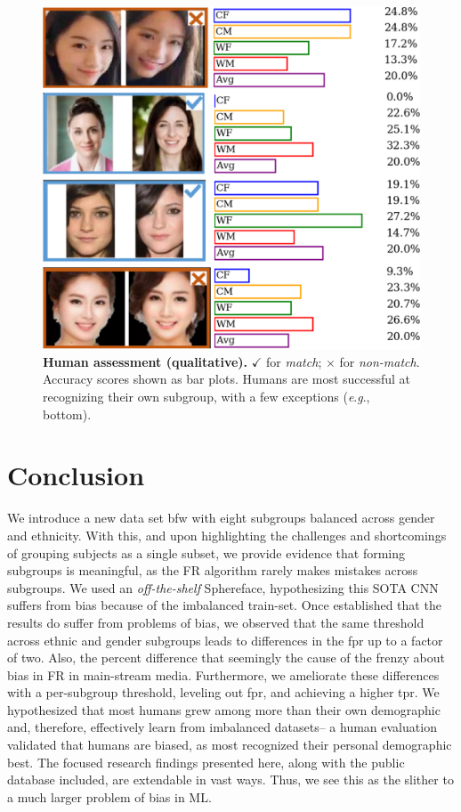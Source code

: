 \documentclass[10pt,twocolumn,letterpaper]{article}
\newcommand{\eg}{\textit{e}.\textit{g}., }
\begin{document}



\begin{figure}[t!] 
	\centering    
	\includegraphics[width=.55\linewidth] {figures/human_eval.pdf}
		\caption{\small{\textbf{Human assessment (qualitative).} $\checkmark$ for \emph{match}; $\times$ for \emph{non-match}. Accuracy scores shown as bar plots. Humans are most successful at recognizing their own subgroup, with a few exceptions (\eg bottom).}}
		\label{fig:human-eval} 
\end{figure} 


\glsresetall
\section{Conclusion}
We introduce a new data set \gls{bfw} with eight subgroups balanced across gender and ethnicity. With this, and upon highlighting the challenges and shortcomings of grouping subjects as a single subset, we provide evidence that forming subgroups is meaningful, as the FR algorithm rarely makes mistakes across subgroups. We used an \textit{off-the-shelf} Sphereface, hypothesizing this SOTA CNN suffers from bias because of the imbalanced train-set. Once established that the results do suffer from problems of bias, we observed that the same threshold across ethnic and gender subgroups leads to differences in the \gls{fpr} up to a factor of two. Also, the percent difference that seemingly the cause of the frenzy about bias in FR in main-stream media. Furthermore, we ameliorate these differences with a per-subgroup threshold, leveling out \gls{fpr}, and achieving a higher \gls{tpr}. We hypothesized that most humans grew among more than their own demographic and, therefore, effectively learn from imbalanced datasets-- a human evaluation validated that humans are biased, as most recognized their personal demographic best. The focused research findings presented here, along with the public database included, are extendable in vast ways. Thus, we see this as the slither to a much larger problem of bias in ML.



{\scriptsize


}

% 
\end{document}
